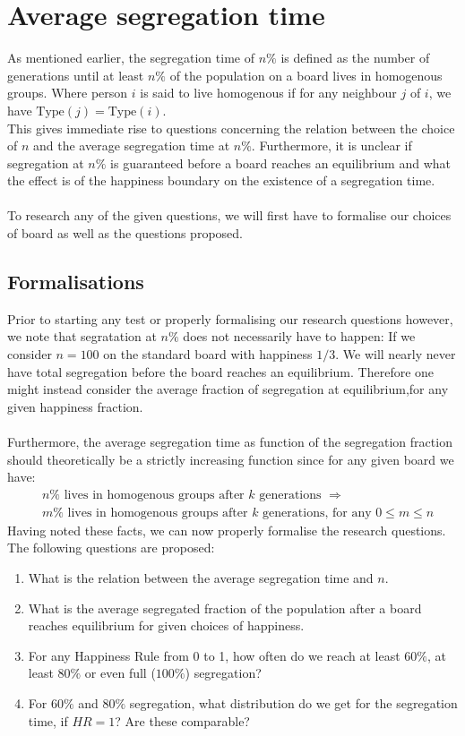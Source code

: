 
\section{Average segregation time}
	As mentioned earlier, the segregation time of \(n\%\) is defined as the number of generations until at least \(n\%\) of the population on a board lives in homogenous groups. 
Where person \(i\) is said to live homogenous if for any neighbour \(j\) of \(i\), we have \(\text{Type}(j)=\text{Type}(i)\).\\
This gives immediate rise to questions concerning the relation between the choice of \(n\) and the average segregation time at \(n\%\). 
Furthermore, it is unclear if segregation at \(n\%\) is guaranteed before a board reaches an equilibrium and what the effect is of the happiness boundary on the existence of a segregation time.\\
\\
To research any of the given questions, we will first have to formalise our choices of board as well as the questions proposed.\\


\subsection{Formalisations}
Prior to starting any test or properly formalising our research questions however, we note that segratation at \(n\%\) does not necessarily have to happen: 
If we consider \(n=100\) on the standard board with happiness \(1/3\). We will nearly never have total segregation before the board reaches an equilibrium.
Therefore one might instead consider the average fraction of segregation at equilibrium,for any given happiness fraction. \\
\\
Furthermore, the average segregation time as function of the segregation fraction should theoretically be a strictly increasing function since for any given board we have:
\begin{align*}
&n\% \text{ lives in homogenous groups after } k \text{ generations } \Rightarrow\\
& m\% \text{ lives in homogenous groups after } k \text{ generations, for any } 0 \leq m \leq n
\end{align*} 
Having noted these facts, we can now properly formalise the research questions.\\
The following questions are proposed:
\begin{enumerate}
 \item What is the relation between the average segregation time and \(n\).
 \item What is the average segregated fraction of the population after a board reaches equilibrium for given choices of happiness.
 \item For any Happiness Rule from 0 to 1, how often do we reach at least $60\%$, at least $80\%$ or even full ($100\%$) segregation?
 \item For $60\%$ and $80\%$ segregation, what distribution do we get for the segregation time, if $HR = 1$? Are these comparable?
\end{enumerate}

